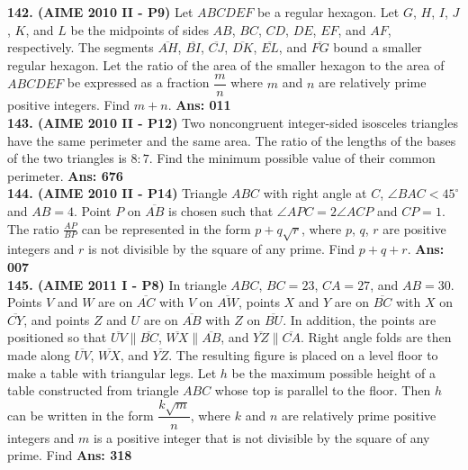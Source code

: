 \documentclass[letterpaper,10pt,addpoints]{exam}
\begin{document}
\textbf{142. (AIME 2010 II - P9) }   Let $ABCDEF$ be a regular hexagon. Let $G$, $H$, $I$, $J$, $K$, and $L$ be the midpoints of sides $AB$, $BC$, $CD$, $DE$, $EF$, and $AF$, respectively. The segments $\overline{AH}$, $\overline{BI}$, $\overline{CJ}$, $\overline{DK}$, $\overline{EL}$, and $\overline{FG}$ bound a smaller regular hexagon. Let the ratio of the area of the smaller hexagon to the area of $ABCDEF$ be expressed as a fraction $\dfrac {m}{n}$ where $m$ and $n$ are relatively prime positive integers. Find $m + n$.  \quad\textbf{Ans: 011}\\


\textbf{143. (AIME 2010 II - P12) }   Two noncongruent integer-sided isosceles triangles have the same perimeter and the same area. The ratio of the lengths of the bases of the two triangles is $8: 7$. Find the minimum possible value of their common perimeter.  \quad\textbf{Ans: 676}\\


\textbf{144. (AIME 2010 II - P14) }   Triangle $ABC$ with right angle at $C$, $\angle BAC < 45^\circ$ and $AB = 4$. Point $P$ on $\overline{AB}$ is chosen such that $\angle APC = 2\angle ACP$ and $CP = 1$. The ratio $\frac{AP}{BP}$ can be represented in the form $p + q\sqrt{r}$, where $p$, $q$, $r$ are positive integers and $r$ is not divisible by the square of any prime. Find $p+q+r$.  \quad\textbf{Ans: 007}\\


\textbf{145. (AIME 2011 I - P8) }   In triangle $ABC$, $BC = 23$, $CA = 27$, and $AB = 30$. Points $V$ and $W$ are on $\overline{AC}$ with $V$ on $\overline{AW}$, points $X$ and $Y$ are on $\overline{BC}$ with $X$ on $\overline{CY}$, and points $Z$ and $U$ are on $\overline{AB}$ with $Z$ on $\overline{BU}$. In addition, the points are positioned so that $\overline{UV}\parallel\overline{BC}$, $\overline{WX}\parallel\overline{AB}$, and $\overline{YZ}\parallel\overline{CA}$. Right angle folds are then made along $\overline{UV}$, $\overline{WX}$, and $\overline{YZ}$. The resulting figure is placed on a level floor to make a table with triangular legs. Let $h$ be the maximum possible height of a table constructed from triangle $ABC$ whose top is parallel to the floor. Then $h$ can be written in the form $\dfrac{k\sqrt{m}}{n}$, where $k$ and $n$ are relatively prime positive integers and $m$ is a positive integer that is not divisible by the square of any prime. Find   \quad\textbf{Ans: 318}
\end{document}
